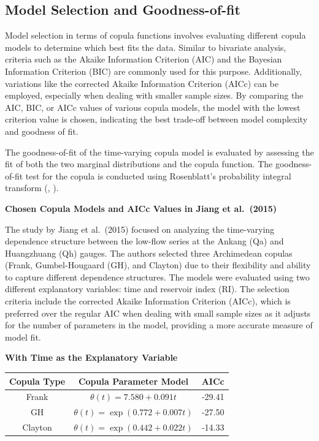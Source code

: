 \documentclass[
]{krantz}
\begin{document}
\subsection{Model Selection and Goodness-of-fit}\label{model-selection-and-goodness-of-fit}

Model selection in terms of copula functions involves evaluating different copula models to determine which best fits the data. Similar to bivariate analysis, criteria such as the Akaike Information Criterion (AIC) and the Bayesian Information Criterion (BIC) are commonly used for this purpose. Additionally, variations like the corrected Akaike Information Criterion (AICc) can be employed, especially when dealing with smaller sample sizes. By comparing the AIC, BIC, or AICc values of various copula models, the model with the lowest criterion value is chosen, indicating the best trade-off between model complexity and goodness of fit.

The goodness-of-fit of the time-varying copula model is evaluated by assessing the fit of both the two marginal distributions and the copula function. The goodness-of-fit test for the copula is conducted using Rosenblatt's probability integral transform (\citet{Rosenblatt1952}, \citet{Genest2009}).

\textbf{Chosen Copula Models and AICc Values in Jiang et al.~(2015)}

The study by Jiang et al.~(2015) focused on analyzing the time-varying dependence structure between the low-flow series at the Ankang (Qa) and Huangzhuang (Qh) gauges. The authors selected three Archimedean copulas (Frank, Gumbel-Hougaard (GH), and Clayton) due to their flexibility and ability to capture different dependence structures. The models were evaluated using two different explanatory variables: time and reservoir index (RI). The selection criteria include the corrected Akaike Information Criterion (AICc), which is preferred over the regular AIC when dealing with small sample sizes as it adjusts for the number of parameters in the model, providing a more accurate measure of model fit.

\textbf{With Time as the Explanatory Variable}

\begin{longtable}[]{@{}ccc@{}}
\toprule\noalign{}
Copula Type & Copula Parameter Model & AICc \\
\midrule\noalign{}
\endhead
\bottomrule\noalign{}
\endlastfoot
Frank & \(\theta(t) = 7.580 + 0.091t\) & -29.41 \\
GH & \(\theta(t) = \exp(0.772 + 0.007t)\) & -27.50 \\
Clayton & \(\theta(t) = \exp(0.442 + 0.022t)\) & -14.33 \\
\end{longtable}
\end{document}
